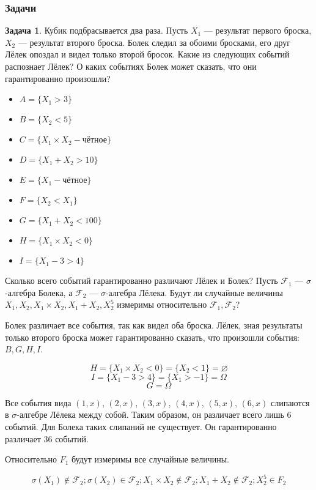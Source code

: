 \documentclass[pdftex, 12pt, a4paper]{article}
\def\F{\ensuremath{\mathcal{F}}} %
\def\s{\ensuremath{\sigma}}
\def \Om{\Omega}
\theoremstyle{definition} %
\newtheorem{problem}{Задача}
\numberwithin{problem}{section}
\numberwithin{blits}{section}
\begin{document}
\subsubsection{Задачи}
\begin{problem}
Кубик подбрасывается два раза. Пусть $X_1$ --- результат первого броска, $X_2$ --- результат второго броска. Болек следил за обоими бросками, его друг Лёлек опоздал и видел только второй бросок. Какие из следующих событий распознает Лёлек? О каких событиях Болек может сказать, что они гарантированно произошли?
\begin{multicols}{2}
\begin{itemize}
\item $A = \{X_1 >3 \}$
\item $B = \{X_2 <5 \}$
\item $C = \{X_1 \times X_2 - \text{чётное} \}$
\item $D = \{X_1 + X_2 >10 \}$
\item $E = \{X_1 - \text{чётное} \}$
\item $F = \{X_2 < X_1 \}$
\item $G = \{X_1 + X_2 < 100 \}$
\item $H = \{X_1 \times X_2 < 0 \}$
\item $I = \{X_1 - 3 >4\}$
\end{itemize}
\end{multicols}
Сколько всего событий гарантированно различают Лёлек и Болек? Пусть $\F_1$ --- \s-алгебра Болека, а $\F_2$ --- \s-алгебра Лёлека. Будут ли случайные величины $X_1, X_2, X_1 \times X_2, X_1 + X_2, X_2^5$ измеримы относительно $\F_1, \F_2$?

\begin{sol}
Болек различает все события, так как видел оба броска. Лёлек, зная результаты только второго броска может гарантированно сказать, что произошли события: $B, G, H, I$.

\[H = \{X_1 \times X_2 < 0 \} = \{X_2 <1\} = \varnothing\]
\[I = \{X_1 - 3 >4\} = \{X_1 > -1 \} = \Om \]
\[G = \Om \]

Все события вида $(1,x)$, $(2,x)$, $(3,x)$, $(4,x)$, $(5,x)$, $(6,x)$ слипаются в \s-алгебре Лёлека между собой. Таким образом, он различает всего лишь 6 событий. Для Болека таких слипаний не существует. Он гарантированно различает 36 событий. 

Относительно $F_1$ будут измеримы все случайные величины. 

\[\s(X_1) \notin \F_2; \s(X_2) \in \F_2; X_1 \times X_2 \notin \F_2; X_1 + X_2 \notin \F_2; X_2^5 \in F_2\]
\end{sol}
\end{problem}
\end{document}
